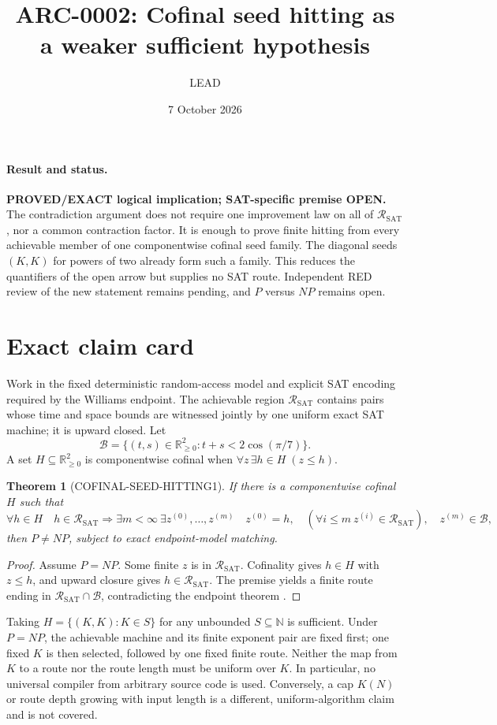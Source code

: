 \documentclass[11pt]{article}
\title{ARC-0002: Cofinal seed hitting as a weaker sufficient hypothesis}
\author{LEAD}
\date{7 October 2026}
\newtheorem{theorem}{Theorem}
\newcommand{\SAT}{\mathrm{SAT}}
\newcommand{\R}{\mathcal R_{\SAT}}
\newcommand{\B}{\mathcal B}
\begin{document}
\maketitle

\paragraph{Result and status.}
\textbf{PROVED/EXACT logical implication; SAT-specific premise OPEN.}
The contradiction argument does not require one improvement law on all of
$\R$, nor a common contraction factor.  It is enough to prove finite hitting
from every achievable member of one componentwise cofinal seed family.  The
diagonal seeds $(K,K)$ for powers of two already form such a family.  This
reduces the quantifiers of the open arrow but supplies no SAT route.  Independent
RED review of the new statement remains pending, and $P$ versus $NP$ remains
open.

\section*{Exact claim card}
Work in the fixed deterministic random-access model and explicit SAT encoding
required by the Williams endpoint.  The achievable region $\R$ contains pairs
whose time and space bounds are witnessed jointly by one uniform exact SAT
machine; it is upward closed.  Let
\[
 \B=\{(t,s)\in\mathbb R_{\ge0}^2:t+s<2\cos(\pi/7)\}.
\]
A set $H\subseteq\mathbb R_{\ge0}^2$ is componentwise cofinal when
$\forall z\,\exists h\in H\;(z\le h)$.

\begin{theorem}[COFINAL-SEED-HITTING1]
If there is a componentwise cofinal $H$ such that
\[
 \forall h\in H\quad
 h\in\R\Longrightarrow
 \exists m<\infty\ \exists z^{(0)},\ldots,z^{(m)}
 \quad z^{(0)}=h,\quad
 (\forall i\le m\ z^{(i)}\in\R),\quad z^{(m)}\in\B,
\]
then $P\ne NP$, subject to exact endpoint-model matching.
\end{theorem}
\begin{proof}
Assume $P=NP$.  Some finite $z$ is in $\R$.  Cofinality gives $h\in H$ with
$z\le h$, and upward closure gives $h\in\R$.  The premise yields a finite
route ending in $\R\cap\B$, contradicting the endpoint theorem
\cite{williams2010}.
\end{proof}

Taking $H=\{(K,K):K\in S\}$ for any unbounded $S\subseteq\mathbb N$ is
sufficient.  Under $P=NP$, the achievable machine and its finite exponent pair
are fixed first; one fixed $K$ is then selected, followed by one fixed finite
route.  Neither the map from $K$ to a route nor the route length must be
uniform over $K$.  In particular, no universal compiler from arbitrary source
code is used.  Conversely, a cap $K(N)$ or route depth growing with input
length is a different, uniform-algorithm claim and is not covered.
\end{document}
